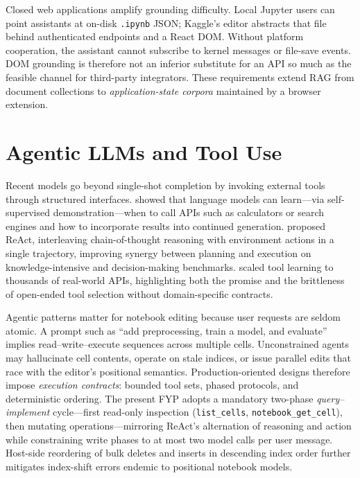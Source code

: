 Closed web applications amplify grounding difficulty. Local Jupyter users can point assistants at on-disk \texttt{.ipynb} JSON; Kaggle's editor abstracts that file behind authenticated endpoints and a React \ac{DOM}. Without platform cooperation, the assistant cannot subscribe to kernel messages or file-save events. \ac{DOM} grounding is therefore not an inferior substitute for an \ac{API} so much as the feasible channel for third-party integrators. These requirements extend \ac{RAG} from document collections to \emph{application-state corpora} maintained by a browser extension.

\section{Agentic LLMs and Tool Use}
\label{sec:lit-agents}

Recent models go beyond single-shot completion by invoking external tools through structured interfaces. \textcite{schick2023toolformer} showed that language models can learn---via self-supervised demonstration---when to call APIs such as calculators or search engines and how to incorporate results into continued generation. \textcite{yao2023react} proposed ReAct, interleaving chain-of-thought reasoning with environment actions in a single trajectory, improving synergy between planning and execution on knowledge-intensive and decision-making benchmarks. \textcite{qin2024toolllm} scaled tool learning to thousands of real-world APIs, highlighting both the promise and the brittleness of open-ended tool selection without domain-specific contracts.

Agentic patterns matter for notebook editing because user requests are seldom atomic. A prompt such as ``add preprocessing, train a model, and evaluate'' implies read--write--execute sequences across multiple cells. Unconstrained agents may hallucinate cell contents, operate on stale indices, or issue parallel edits that race with the editor's positional semantics. Production-oriented designs therefore impose \emph{execution contracts}: bounded tool sets, phased protocols, and deterministic ordering. The present FYP adopts a mandatory two-phase \emph{query--implement} cycle---first read-only inspection (\texttt{list\_cells}, \texttt{notebook\_get\_cell}), then mutating operations---mirroring ReAct's alternation of reasoning and action while constraining write phases to at most two model calls per user message. Host-side reordering of bulk deletes and inserts in descending index order further mitigates index-shift errors endemic to positional notebook models.

